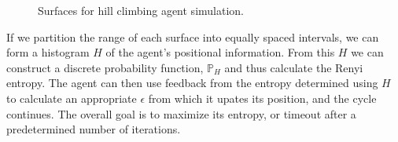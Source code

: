 \documentclass[english]{article}
\begin{document}
\begin{figure}


\hfill{}\protect\caption{Surfaces for hill climbing agent simulation.}
\end{figure}


If we partition the range of each surface into equally spaced intervals,
we can form a histogram $H$ of the agent's positional information.
From this $H$ we can construct a discrete probability function, $\mathbb{P}_{H}$
and thus calculate the Renyi entropy. The agent can then use feedback
from the entropy determined using $H$ to calculate an appropriate
$\epsilon$ from which it upates its position, and the cycle continues.
The overall goal is to maximize its entropy, or timeout after a predetermined
number of iterations.
\end{document}

